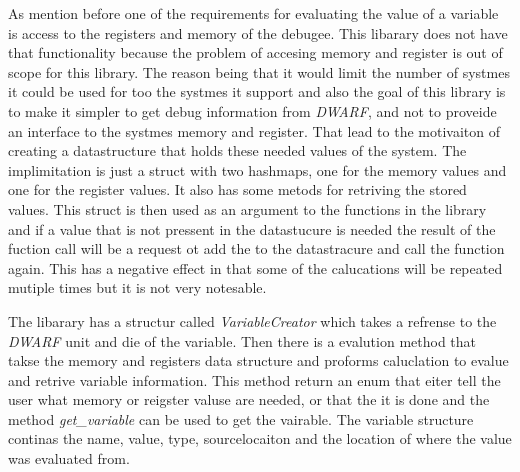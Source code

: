 As mention before one of the requirements for evaluating the value of a variable is access to the registers and memory of the debugee.
This libarary does not have that functionality because the problem of accesing memory and register is out of scope for this library.
The reason being that it would limit the number of systmes it could be used for too the systmes it support and also the goal of this library is to make it simpler to get debug information from \emph{DWARF}, and not to proveide an interface to the systmes memory and register.
That lead to the motivaiton of creating a datastructure that holds these needed values of the system.
The implimitation is just a struct with two hashmaps, one for the memory values and one for the register values.
It also has some metods for retriving the stored values.
This struct is then used as an argument to the functions in the library and if a value that is not pressent in the datastucure is needed the result of the fuction call will be a request ot add the to the datastracure and call the function again.
This has a negative effect in that some of the calucations will be repeated mutiple times but it is not very notesable.


The libarary has a structur called \emph{VariableCreator} which  takes a refrense to the \emph{DWARF} unit and die of the variable.
Then there is a evalution method that takse the memory and registers data structure and proforms caluclation to evalue and retrive variable information.
This method return an enum that eiter tell the user what memory or reigster valuse are needed, or that the it is done and the method \emph{get\_variable} can be used to get the vairable.
The variable structure continas the name, value, type, sourcelocaiton and the location of where the value was evaluated from.


